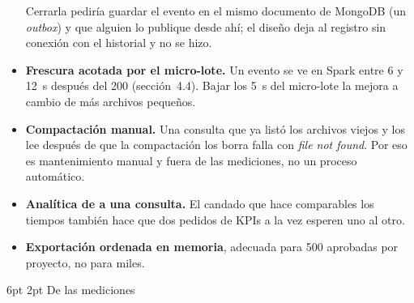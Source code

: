 \documentclass[10pt,letterpaper]{article}
\makeatletter
\renewcommand\subsection{\@startsection{subsection}{2}{\z@}%
  {6pt \@plus 1pt}{2pt}%
  {\normalfont\normalsize\bfseries\color{acc}}}
\makeatother
\begin{document}
\begin{itemize}
Cerrarla pediría guardar el evento en el mismo documento de MongoDB (un \emph{outbox}) y que alguien lo
publique desde ahí; el diseño deja al registro sin conexión con el historial y no se hizo.
\item \textbf{Frescura acotada por el micro-lote.} Un evento se ve en Spark entre 6 y 12~s después del 200
(sección~4.4). Bajar los 5~s del micro-lote la mejora a cambio de más archivos pequeños.
\item \textbf{Compactación manual.} Una consulta que ya listó los archivos viejos y los lee después de que la
compactación los borra falla con \emph{file not found}. Por eso es mantenimiento manual y fuera de las
mediciones, no un proceso automático.
\item \textbf{Analítica de a una consulta.} El candado que hace comparables los tiempos también hace que dos
pedidos de KPIs a la vez esperen uno al otro.
\item \textbf{Exportación ordenada en memoria}, adecuada para 500 aprobadas por proyecto, no para miles.
\end{itemize}

\subsection{De las mediciones}
\end{document}
